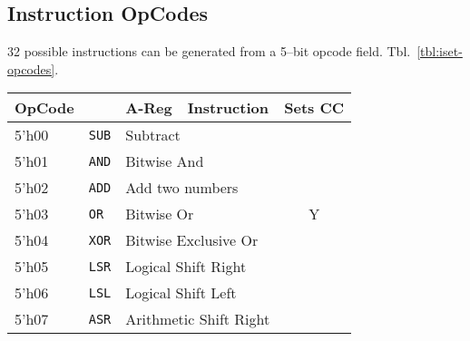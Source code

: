 \documentclass{gqtekspec}
\begin{document}
\subsection{Instruction OpCodes}\label{sec:isa-opcodes}
32 possible instructions can be generated from a 5--bit opcode field.
Tbl.~\ref{tbl:iset-opcodes}.
\begin{table}\begin{center}
\begin{tabular}{|l|l|l|l|c|} \hline \rowcolor[gray]{0.85}
OpCode & & A-Reg & Instruction &Sets CC \\\hline\hline
5'h00 & {\tt SUB} & \multicolumn{2}{l|}{Subtract} &   \\\cline{1-4}
5'h01 & {\tt AND} & \multicolumn{2}{l|}{Bitwise And} &   \\\cline{1-4}
5'h02 & {\tt ADD} & \multicolumn{2}{l|}{Add two numbers} &   \\\cline{1-4}
5'h03 & {\tt OR}  & \multicolumn{2}{l|}{Bitwise Or} & Y \\\cline{1-4}
5'h04 & {\tt XOR} & \multicolumn{2}{l|}{Bitwise Exclusive Or} &   \\\cline{1-4}
5'h05 & {\tt LSR} & \multicolumn{2}{l|}{Logical Shift Right} &   \\\cline{1-4}
5'h06 & {\tt LSL} & \multicolumn{2}{l|}{Logical Shift Left} &   \\\cline{1-4}
5'h07 & {\tt ASR} & \multicolumn{2}{l|}{Arithmetic Shift Right} &   \\\hline


\end{tabular}
\end{center}
\end{table}
\end{document}
